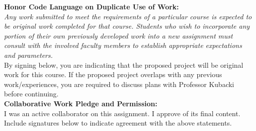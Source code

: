 \documentclass[11pt]{article}
\begin{document}
	\begin{framed}
		\noindent \textbf{Honor Code Language on Duplicate Use of Work:}\\  \textit{Any work submitted to meet the requirements of a particular course is expected to be original work completed for that course. Students who wish to incorporate any portion of their own previously developed work into a new assignment must consult with the involved faculty members to establish appropriate expectations and parameters.} \\
		
		By signing below, you are indicating that the proposed project will be original work for this course.  If the proposed project overlaps with any previous work/experiences, you are required to discuss plans with Professor Kubacki before continuing.\\
		
		\noindent \textbf{Collaborative Work Pledge and Permission:}\\ I was an active collaborator on this assignment.  I approve of its final content.\\
		
		Include signatures below to indicate agreement with the above statements.
		\vspace{1.5in}
	\end{framed}
	\nocite{*}
	
\end{document}
